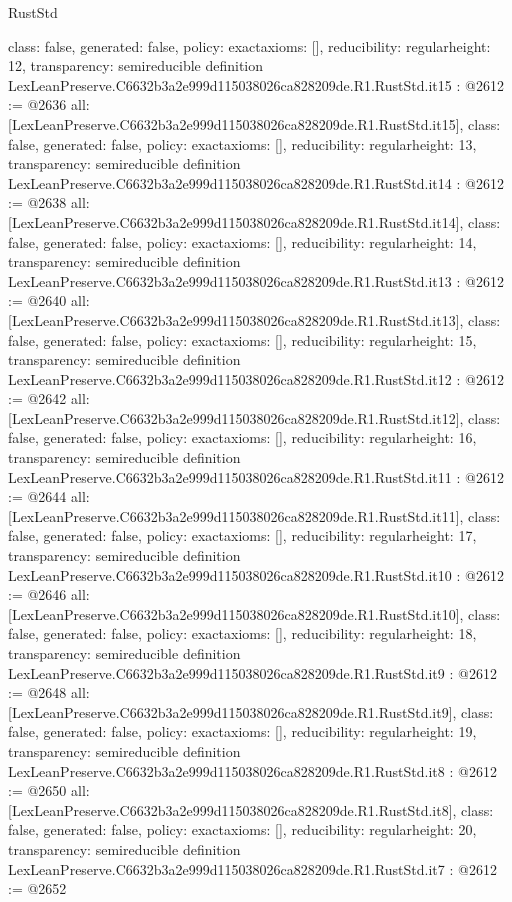 \begin{lexlean}{RustStd}
\begin{coremodule}
{  class: false,
  generated: false,
  policy: exact{axioms: []},
  reducibility: regular{height: 12},
  transparency: semireducible
}
definition LexLeanPreserve.C6632b3a2e999d115038026ca828209de.R1.RustStd.it15 : @2612 := @2636 {
  all: [LexLeanPreserve.C6632b3a2e999d115038026ca828209de.R1.RustStd.it15],
  class: false,
  generated: false,
  policy: exact{axioms: []},
  reducibility: regular{height: 13},
  transparency: semireducible
}
definition LexLeanPreserve.C6632b3a2e999d115038026ca828209de.R1.RustStd.it14 : @2612 := @2638 {
  all: [LexLeanPreserve.C6632b3a2e999d115038026ca828209de.R1.RustStd.it14],
  class: false,
  generated: false,
  policy: exact{axioms: []},
  reducibility: regular{height: 14},
  transparency: semireducible
}
definition LexLeanPreserve.C6632b3a2e999d115038026ca828209de.R1.RustStd.it13 : @2612 := @2640 {
  all: [LexLeanPreserve.C6632b3a2e999d115038026ca828209de.R1.RustStd.it13],
  class: false,
  generated: false,
  policy: exact{axioms: []},
  reducibility: regular{height: 15},
  transparency: semireducible
}
definition LexLeanPreserve.C6632b3a2e999d115038026ca828209de.R1.RustStd.it12 : @2612 := @2642 {
  all: [LexLeanPreserve.C6632b3a2e999d115038026ca828209de.R1.RustStd.it12],
  class: false,
  generated: false,
  policy: exact{axioms: []},
  reducibility: regular{height: 16},
  transparency: semireducible
}
definition LexLeanPreserve.C6632b3a2e999d115038026ca828209de.R1.RustStd.it11 : @2612 := @2644 {
  all: [LexLeanPreserve.C6632b3a2e999d115038026ca828209de.R1.RustStd.it11],
  class: false,
  generated: false,
  policy: exact{axioms: []},
  reducibility: regular{height: 17},
  transparency: semireducible
}
definition LexLeanPreserve.C6632b3a2e999d115038026ca828209de.R1.RustStd.it10 : @2612 := @2646 {
  all: [LexLeanPreserve.C6632b3a2e999d115038026ca828209de.R1.RustStd.it10],
  class: false,
  generated: false,
  policy: exact{axioms: []},
  reducibility: regular{height: 18},
  transparency: semireducible
}
definition LexLeanPreserve.C6632b3a2e999d115038026ca828209de.R1.RustStd.it9 : @2612 := @2648 {
  all: [LexLeanPreserve.C6632b3a2e999d115038026ca828209de.R1.RustStd.it9],
  class: false,
  generated: false,
  policy: exact{axioms: []},
  reducibility: regular{height: 19},
  transparency: semireducible
}
definition LexLeanPreserve.C6632b3a2e999d115038026ca828209de.R1.RustStd.it8 : @2612 := @2650 {
  all: [LexLeanPreserve.C6632b3a2e999d115038026ca828209de.R1.RustStd.it8],
  class: false,
  generated: false,
  policy: exact{axioms: []},
  reducibility: regular{height: 20},
  transparency: semireducible
}
definition LexLeanPreserve.C6632b3a2e999d115038026ca828209de.R1.RustStd.it7 : @2612 := @2652 {
}
\end{coremodule}
\end{lexlean}
